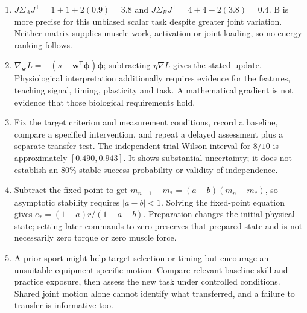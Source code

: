 \begin{enumerate}
\item $J\Sigma_AJ^{\mathsf T}=1+1+2(0.9)=3.8$ and $J\Sigma_BJ^{\mathsf T}=4+4-2(3.8)=0.4$. B is more precise for this unbiased scalar task despite greater joint variation. Neither matrix supplies muscle work, activation or joint loading, so no energy ranking follows.
\item $\nabla_{\bm{w}}L=-(s-\bm{w}^{\mathsf T}\bm{\phi})\bm{\phi}$; subtracting $\eta\nabla L$ gives the stated update. Physiological interpretation additionally requires evidence for the features, teaching signal, timing, plasticity and task. A mathematical gradient is not evidence that those biological requirements hold.
\item Fix the target criterion and measurement conditions, record a baseline, compare a specified intervention, and repeat a delayed assessment plus a separate transfer test. The independent-trial Wilson interval for $8/10$ is approximately $[0.490,0.943]$. It shows substantial uncertainty; it does not establish an 80\% stable success probability or validity of independence.
\item Subtract the fixed point to get $m_{n+1}-m_*=(a-b)(m_n-m_*)$, so asymptotic stability requires $|a-b|<1$. Solving the fixed-point equation gives $e_*=(1-a)r/(1-a+b)$. Preparation changes the initial physical state; setting later commands to zero preserves that prepared state and is not necessarily zero torque or zero muscle force.
\item A prior sport might help target selection or timing but encourage an unsuitable equipment-specific motion. Compare relevant baseline skill and practice exposure, then assess the new task under controlled conditions. Shared joint motion alone cannot identify what transferred, and a failure to transfer is informative too.
\end{enumerate}
\clearpage
\flushbottom{}
